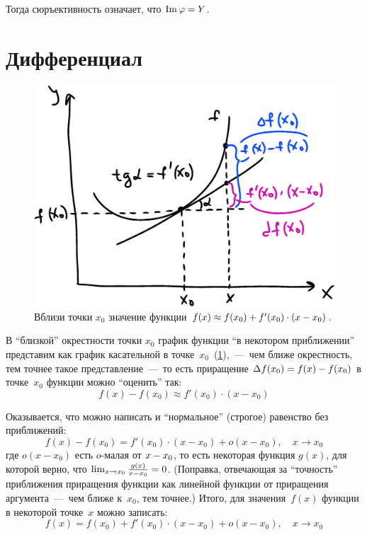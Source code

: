 \documentclass[a4paper,12pt]{article}
\DeclareMathOperator{\Imag}{Im}
\begin{document}
  Тогда сюръективность означает, что $\Imag \phi \hm= Y$.
  
  
  
  
  
  \section{Дифференциал}


  \begin{figure}[ht]
      \centering
      
      \includegraphics[width=0.8\linewidth]{images/diff-f-df}
      
      \caption{Вблизи точки $x_0$ значение функции $f(x) \hm\approx f(x_0) \hm+ f'(x_0) \cdot (x - x_0)$.}
      \label{fig:diff-f}
  \end{figure}

  В ``близкой'' окрестности точки $x_0$ график функции ``в некотором приближении'' представим как график касательной в точке~$x_0$~(\ref{fig:diff-f}),~---~чем ближе окрестность, тем точнее такое представление~---~то есть приращение $\Delta f(x_0) \hm= f(x) \hm- f(x_0)$ в точке~$x_0$ функции можно ``оценить'' так:
  \[
    f(x) - f(x_0) \approx f'(x_0) \cdot (x - x_0)
  \]

  Оказывается, что можно написать и ``нормальное'' (строгое) равенство без приближений:
  \[
    f(x) - f(x_0) = f'(x_0) \cdot (x - x_0) + o(x - x_0),\quad x \to x_0
  \]
  где $o(x - x_0)$ есть $o$-малая от $x \hm- x_0$, то есть некоторая функция $g(x)$, для которой верно, что $\lim_{x \to x_0} \frac{g(x)}{x - x_0} \hm= 0$.
  (Поправка, отвечающая за ``точность'' приближения приращения функции как линейной функции от приращения аргумента~---~чем ближе к~$x_0$, тем точнее.)
  Итого, для значения~$f(x)$ функции в некоторой точке~$x$ можно записать:
  \[
    f(x) = f(x_0) + f'(x_0) \cdot (x - x_0) + o(x - x_0),\quad x \to x_0
  \]
\end{document}
